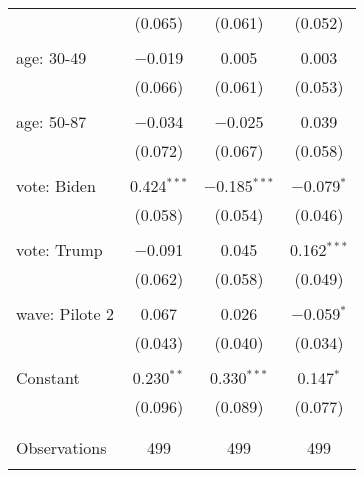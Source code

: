 \begin{tabular}{@{\extracolsep{5pt}}lccc}
  & (0.065) & (0.061) & (0.052) \\ 
  & & & \\ 
 age: 30-49 & $-$0.019 & 0.005 & 0.003 \\ 
  & (0.066) & (0.061) & (0.053) \\ 
  & & & \\ 
 age: 50-87 & $-$0.034 & $-$0.025 & 0.039 \\ 
  & (0.072) & (0.067) & (0.058) \\ 
  & & & \\ 
 vote: Biden & 0.424$^{***}$ & $-$0.185$^{***}$ & $-$0.079$^{*}$ \\ 
  & (0.058) & (0.054) & (0.046) \\ 
  & & & \\ 
 vote: Trump & $-$0.091 & 0.045 & 0.162$^{***}$ \\ 
  & (0.062) & (0.058) & (0.049) \\ 
  & & & \\ 
 wave: Pilote 2 & 0.067 & 0.026 & $-$0.059$^{*}$ \\ 
  & (0.043) & (0.040) & (0.034) \\ 
  & & & \\ 
 Constant & 0.230$^{**}$ & 0.330$^{***}$ & 0.147$^{*}$ \\ 
  & (0.096) & (0.089) & (0.077) \\ 
  & & & \\ 
\hline \\[-1.8ex] 

Observations & 499 & 499 & 499 \\ 
\hline 
\hline \\[-1.8ex] 
\end{tabular} 